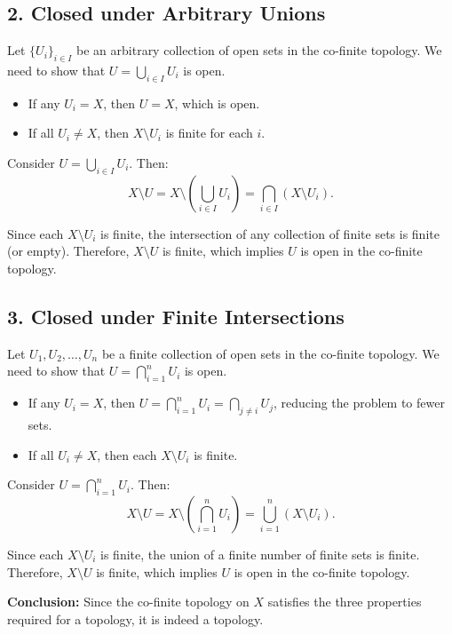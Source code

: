 \subsection*{2. Closed under Arbitrary Unions}

Let \(\{ U_i \}_{i \in I}\) be an arbitrary collection of open sets in the co-finite topology. We need to show that \(U = \bigcup_{i \in I} U_i\) is open.

\begin{itemize}
	\item If any \(U_i = X\), then \(U = X\), which is open.
	\item If all \(U_i \neq X\), then \(X \setminus U_i\) is finite for each \(i\).
\end{itemize}

Consider \(U = \bigcup_{i \in I} U_i\). Then:
\[ X \setminus U = X \setminus \left( \bigcup_{i \in I} U_i \right) = \bigcap_{i \in I} (X \setminus U_i). \]

Since each \(X \setminus U_i\) is finite, the intersection of any collection of finite sets is finite (or empty). Therefore, \(X \setminus U\) is finite, which implies \(U\) is open in the co-finite topology.

\subsection*{3. Closed under Finite Intersections}

Let \(U_1, U_2, \ldots, U_n\) be a finite collection of open sets in the co-finite topology. We need to show that \(U = \bigcap_{i=1}^n U_i\) is open.

\begin{itemize}
	\item If any \(U_i = X\), then \(U = \bigcap_{i=1}^n U_i = \bigcap_{j \neq i} U_j\), reducing the problem to fewer sets.
	\item If all \(U_i \neq X\), then each \(X \setminus U_i\) is finite.
\end{itemize}

Consider \(U = \bigcap_{i=1}^n U_i\). Then:
\[ X \setminus U = X \setminus \left( \bigcap_{i=1}^n U_i \right) = \bigcup_{i=1}^n (X \setminus U_i). \]

Since each \(X \setminus U_i\) is finite, the union of a finite number of finite sets is finite. Therefore, \(X \setminus U\) is finite, which implies \(U\) is open in the co-finite topology.

\textbf{Conclusion:} Since the co-finite topology on \(X\) satisfies the three properties required for a topology, it is indeed a topology.

